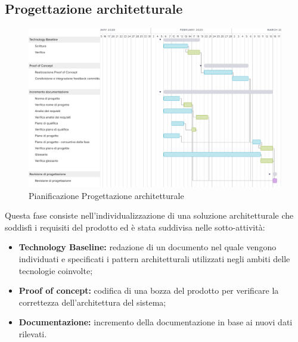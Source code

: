 \subsection{Progettazione architetturale}
\begin{figure}[h!]
	\includegraphics[width=\textwidth]{res/img/g3}
	\caption{Pianificazione Progettazione architetturale}
\end{figure}
Questa fase consiste nell'individualizzazione di una soluzione architetturale che soddisfi i requisiti del prodotto ed è stata suddivisa nelle sotto-attività:
\begin{itemize}
	\item \textbf{Technology Baseline:} redazione di un documento nel quale vengono individuati e specificati i pattern architetturali utilizzati negli ambiti delle tecnologie coinvolte;
	\item  \textbf{Proof of concept:} codifica di una bozza del prodotto per verificare la correttezza dell'architettura del sistema;
	\item \textbf{Documentazione:} incremento della documentazione in base ai nuovi dati rilevati.
\end{itemize}


